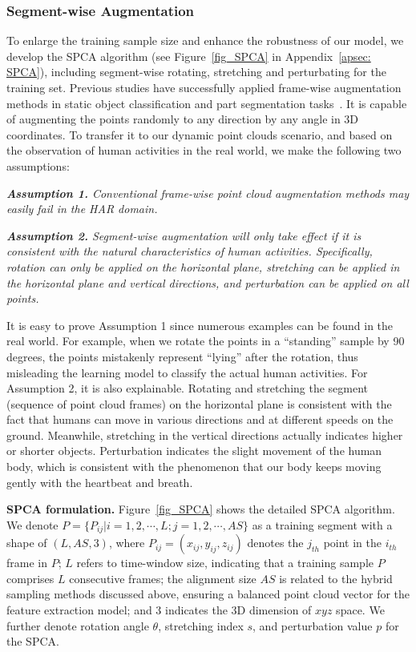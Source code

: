 \subsubsection{Segment-wise Augmentation}

To enlarge the training sample size and enhance the robustness of our model, we develop the SPCA algorithm (see Figure~\ref{fig_SPCA} in Appendix~\ref{apsec: SPCA}), including segment-wise rotating, stretching and perturbating for the training set. 
Previous studies have successfully applied frame-wise augmentation methods in static object classification and part segmentation tasks~\cite{qi2017pointnet}. It is capable of augmenting the points randomly to any direction by any angle in 3D coordinates. 
To transfer it to our dynamic point clouds scenario, and based on the observation of human activities in the real world, we make the following two assumptions:

\textit{\textbf{Assumption 1.} Conventional frame-wise point cloud augmentation methods may easily fail in the HAR domain.}

\textit{\textbf{Assumption 2.}  Segment-wise augmentation will only take effect if it is consistent with the natural characteristics of human activities. 
Specifically, rotation can only be applied on the horizontal plane, stretching can be applied in the horizontal plane and vertical directions, and perturbation can be applied on all points.}

It is easy to prove Assumption 1 since numerous examples can be found in the real world. For example, when we rotate the points in a ``standing'' sample by 90 degrees, the points mistakenly represent ``lying'' after the rotation, thus misleading the learning model to classify the actual human activities.
For Assumption 2, it is also explainable. Rotating and stretching the segment (sequence of point cloud frames) on the horizontal plane is consistent with the fact that humans can move in various directions and at different speeds on the ground. Meanwhile, stretching in the vertical directions actually indicates higher or shorter objects. Perturbation indicates the slight movement of the human body, which is consistent with the phenomenon that our body keeps moving gently with the heartbeat and breath.

\textbf{SPCA formulation.} 
Figure~\ref{fig_SPCA} shows the detailed SPCA algorithm. 
We denote $P=\{P_{ij}|i=1,2,\cdots,L;j=1,2,\cdots,AS\}$ as a training segment with a shape of $(L, AS, 3)$,  
where $P_{ij}=(x_{ij},y_{ij},z_{ij})$ denotes the $j_{th}$ point in the $i_{th}$ frame in $P$; $L$ refers to time-window size, indicating that a training sample $P$ comprises $L$ consecutive frames; 
the alignment size $AS$ is related to the hybrid sampling methods discussed above, ensuring a balanced point cloud vector for the feature extraction model; and 3 indicates the 3D dimension of $xyz$ space. 
We further denote rotation angle $\theta$, stretching index $s$, and perturbation value $p$ for the SPCA. 

